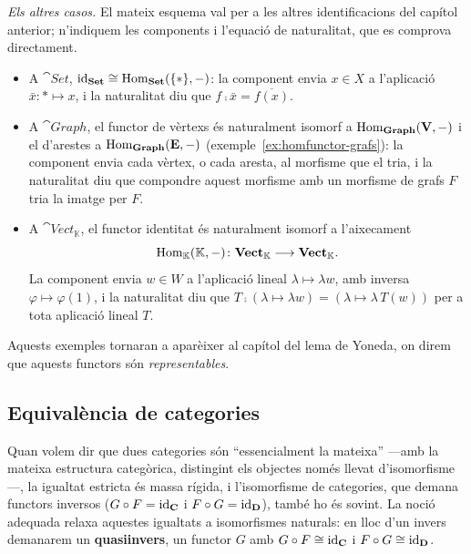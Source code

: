 \begin{exemple}
\emph{Els altres casos.} El mateix esquema val per a les altres identificacions del capítol anterior; n'indiquem les components i l'equació de naturalitat, que es comprova directament.
\begin{itemize}
  \item A $\cat{Set}$, $\operatorname{id}_{\mathbf{Set}}\cong\operatorname{Hom}_{\mathbf{Set}}(\{\ast\},-)$: la component envia $x\in X$ a l'aplicació $\bar x\colon\ast\mapsto x$, i la naturalitat diu que $f\comp\bar x=\overline{f(x)}$.
  \item A $\cat{Graph}$, el functor de vèrtexs és naturalment isomorf a $\operatorname{Hom}_{\mathbf{Graph}}(\mathbf V,-)$ i el d'arestes a $\operatorname{Hom}_{\mathbf{Graph}}(\mathbf E,-)$ (exemple~\ref{ex:homfunctor-grafs}): la component envia cada vèrtex, o cada aresta, al morfisme que el tria, i la naturalitat diu que compondre aquest morfisme amb un morfisme de grafs $F$ tria la imatge per $F$.
  \item A $\cat{Vect}_{\mathbb K}$, el functor identitat és naturalment isomorf a l'aixecament
\[
\operatorname{Hom}_{\mathbb K}(\mathbb K,-)\colon\mathbf{Vect}_{\mathbb K}\longrightarrow\mathbf{Vect}_{\mathbb K}.
\]
La component envia $w\in W$ a l'aplicació lineal $\lambda\mapsto\lambda w$, amb inversa $\varphi\mapsto\varphi(1)$, i la naturalitat diu que $T\comp(\lambda\mapsto\lambda w)=(\lambda\mapsto\lambda\,T(w))$ per a tota aplicació lineal $T$.
\end{itemize}
Aquests exemples tornaran a aparèixer al capítol del lema de Yoneda, on direm que aquests functors són \emph{representables}.
\end{exemple}

\subsection{Equivalència de categories}\label{sec:equivalencia}

Quan volem dir que dues categories són \enquote{essencialment la mateixa} ---amb la mateixa estructura categòrica, distingint els objectes només llevat d'isomorfisme---, la igualtat estricta és massa rígida, i l'isomorfisme de categories, que demana functors inversos ($G\circ F=\operatorname{id}_{\mathbf{C}}$ i $F\circ G=\operatorname{id}_{\mathbf{D}}$), també ho és sovint. La noció adequada relaxa aquestes igualtats a isomorfismes naturals: en lloc d'un invers demanarem un \textbf{quasiinvers}, un functor $G$ amb $G\circ F\cong\operatorname{id}_{\mathbf{C}}$ i $F\circ G\cong\operatorname{id}_{\mathbf{D}}$.

